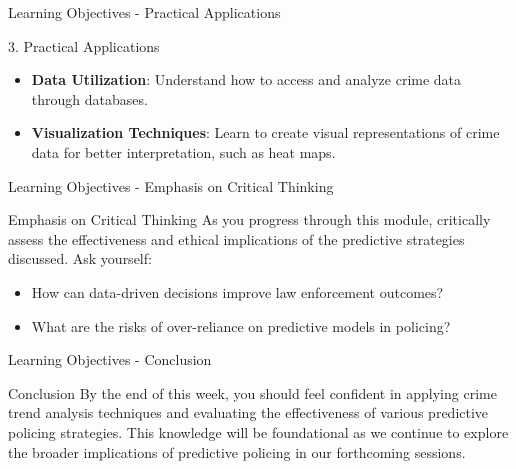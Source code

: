 \documentclass[aspectratio=169]{beamer}
\begin{document}
\begin{frame}[fragile]{Learning Objectives - Practical Applications}
    \begin{block}{3. Practical Applications}
        \begin{itemize}
            \item \textbf{Data Utilization}: Understand how to access and analyze crime data through databases.
            \item \textbf{Visualization Techniques}: Learn to create visual representations of crime data for better interpretation, such as heat maps.
        \end{itemize}
    \end{block}
\end{frame}

\begin{frame}[fragile]{Learning Objectives - Emphasis on Critical Thinking}
    \begin{block}{Emphasis on Critical Thinking}
        As you progress through this module, critically assess the effectiveness and ethical implications of the predictive strategies discussed. Ask yourself:
        \begin{itemize}
            \item How can data-driven decisions improve law enforcement outcomes?
            \item What are the risks of over-reliance on predictive models in policing?
        \end{itemize}
    \end{block}
\end{frame}

\begin{frame}[fragile]{Learning Objectives - Conclusion}
    \begin{block}{Conclusion}
        By the end of this week, you should feel confident in applying crime trend analysis techniques and evaluating the effectiveness of various predictive policing strategies. This knowledge will be foundational as we continue to explore the broader implications of predictive policing in our forthcoming sessions.
    \end{block}
\end{frame}
\end{document}
